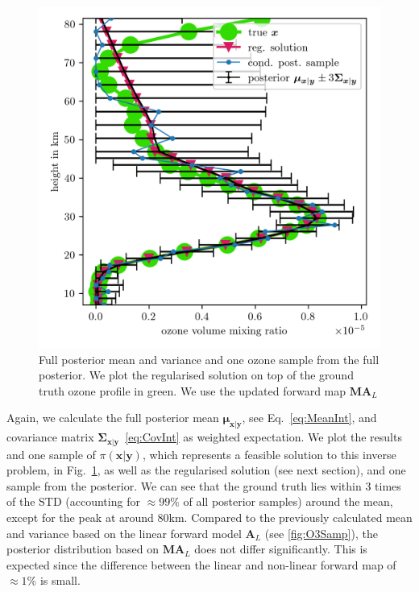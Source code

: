 \begin{figure}[ht!]
	\centering
	\includegraphics{SecRecResinclRegandSampl.png}
	\caption[Full posterior mean and variance of ozone and the regularised solution compared to the ground truth.]{Full  posterior mean and variance and one ozone sample from the full posterior. We plot the regularised solution on top of the ground truth ozone profile in green. We use the updated forward map $\bm{M}\bm{A}_L$}
	\label{fig:O3SolplsReg}
\end{figure} 
Again, we calculate the full posterior mean $\bm{\mu}_{\bm{x}|\bm{y}}$, see Eq.~\ref{eq:MeanInt}, and covariance matrix $\bm{\Sigma}_{ \bm{x}|\bm{y}}$~\ref{eq:CovInt} as weighted expectation.
We plot the results and one sample of $\pi(\bm{x}|\bm{y})$, which represents a feasible solution to this inverse problem, in Fig.~\ref{fig:O3SolplsReg}, as well as the regularised solution (see next section), and one sample from the posterior.
We can see that the ground truth lies within 3 times of the STD (accounting for $\approx 99 \%$ of all posterior samples) around the mean, except for the peak at around $80$km.
Compared to the previously calculated mean and variance based on the linear forward model $\bm{A}_L$ (see \ref{fig:O3Samp}), the posterior distribution based on $\bm{M A}_L$ does not differ significantly.
This is expected since the difference between the linear and non-linear forward map of $\approx 1 \%$ is small.

